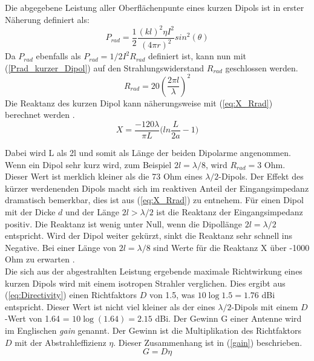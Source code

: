 Die abgegebene Leistung aller Oberflächenpunte eines kurzen Dipols ist in erster Näherung definiert als:
\begin{equation}
P_{rad}=\dfrac{1}{2}\dfrac{(kl)^{2}\eta I^{2}}{(4\pi r)^{2}}sin^{2}(\theta)
\label{Prad_kurzer_Dipol}
\end{equation}
Da $P_{rad}$ ebenfalls als $P_{rad}=1/2I^{2}R_{rad}$ definiert ist, kann nun mit (\ref{Prad_kurzer_Dipol}) auf den  Strahlungswiderstand $R_{rad}$ geschlossen werden.
\begin{equation}
R_{rad}=20 (\dfrac{2 \pi l}{\lambda})^{2}
\label{R_rad_kurzer_Dipol}
\end{equation}
Die Reaktanz des kurzen Dipol kann näherungsweise mit (\ref{eq:X_Rrad}) berechnet werden \cite{Antenne_Theory_Xant}.
\begin{equation}\label{eq:X_Rrad}
X=\dfrac{-120\lambda}{\pi L}\biggl(ln\dfrac{L}{2a}-1\biggr)
\end{equation}

Dabei wird L als 2l und somit als Länge der beiden Dipolarme angenommen.
Wenn ein Dipol sehr kurz wird, zum Beispiel $2l=\lambda/8$,  wird $R_{rad} = 3$ Ohm. Dieser Wert ist merklich kleiner als die 73 Ohm eines $\lambda/2$-Dipols. Der Effekt des kürzer werdenenden Dipols macht sich im  reaktiven Anteil der Eingangsimpedanz dramatisch bemerkbar, dies ist aus (\ref{eq:X_Rrad}) zu entnehem. Für einen Dipol mit der Dicke $d$ und der Länge $2l>\lambda/2$ ist die Reaktanz der Eingangsimpedanz positiv. Die Reaktanz ist wenig unter Null, wenn die Dipollänge $2l=\lambda/2$ entspricht. Wird der Dipol weiter gekürzt,  sinkt die Reaktanz sehr schnell ins Negative. Bei einer Länge von $2l=\lambda/8$ sind Werte für die Reaktanz X über -1000 Ohm zu erwarten \cite{elliott1981antenna}. \\
Die sich aus der abgestrahlten Leistung ergebende maximale Richtwirkung eines kurzen Dipols wird mit einem isotropen Strahler verglichen. Dies ergibt aus (\ref{eq:Directivity}) einen Richtfaktors $D$ von 1.5, was $10\log{1.5}=1.76$ dBi entspricht. Dieser Wert ist nicht viel kleiner als der eines $\lambda/2$-Dipols mit einem $D$-Wert von 1.64 = $10\log{(1.64)}=2.15$ dBi. Der Gewinn G einer Antenne wird im Englischen \textit{gain} genannt. Der Gewinn ist die Multiplikation des Richtfaktors $D$ mit der Abstrahleffizienz $\eta$. Dieser Zusammenhang ist in (\ref{gain}) beschrieben.
\begin{equation}\label{gain}
G=D\eta
\end{equation}




